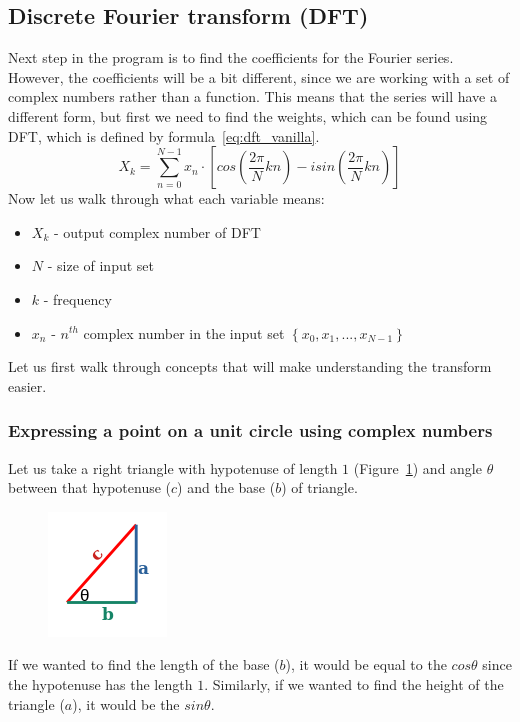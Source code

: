 \documentclass[titlepage]{article}
\begin{document}
\subsection{Discrete Fourier transform (DFT)}

    Next step in the program is to find the coefficients for the Fourier series.
    However, the coefficients will be a bit different, since we are working with 
    a set of complex numbers rather than a function. This means that the series
    will have a different form, but first we need to find the weights, which can
    be found using DFT, which is defined by formula~\eqref{eq:dft_vanilla}.
    \begin{equation}\label{eq:dft_vanilla}
        X_k = \sum_{n=0}^{N-1}x_n \cdot \left[cos\left(\frac{2\pi}{N}kn\right) - 
        isin\left(\frac{2\pi}{N}kn\right)\right]
    \end{equation}
    Now let us walk through what each variable means:
    \begin{itemize}
        \item $X_k$ - output complex number of DFT
        \item $N$ - size of input set
        \item $k$ - frequency
        \item $x_n$ - $n^{th}$ complex number in the input set $\left\{x_0, x_1,
            ..., x_{N-1} \right\}$
    \end{itemize}
    
    Let us first walk through concepts that will make understanding the transform
    easier.

\subsubsection{Expressing a point on a unit circle using complex numbers}

    Let us take a right triangle with hypotenuse of length $1$
    (Figure~\ref{fig:right_triangle})
    and angle $\theta$ between that hypotenuse ($c$) and the base ($b$) of triangle.
    \begin{figure}[H]
        \caption{}
        \centering
        \includegraphics[width=0.2\linewidth]{right_triangle}
        \label{fig:right_triangle}
    \end{figure}
    If we wanted to find the length of the base ($b$), it would be equal
    to the $cos\theta$ since the hypotenuse has the length $1$. Similarly, if we
    wanted to find the height of the triangle ($a$), it would be the $sin\theta$.
\end{document}
